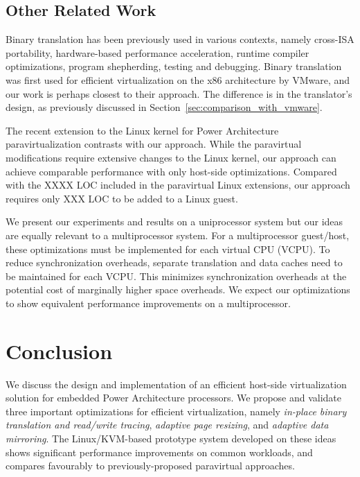 \documentclass[10pt,twocolumn]{article}
\begin{document}
\subsection{Other Related Work}
Binary translation has been previously used in various contexts, namely
cross-ISA portability\cite{bansal:osdi08, qemu:software}, hardware-based
performance acceleration\cite{transmeta_crusoe:chip}, runtime compiler
optimizations\cite{bala00dynamo}, program shepherding\cite{bruening04thesis},
testing and debugging\cite{valgrind}. Binary translation was
first used for efficient virtualization on the x86 architecture by
VMware\cite{agesen:comparison}, and our work
is perhaps closest to their approach. The difference is in the translator's design,
as previously discussed in Section~\ref{sec:comparison_with_vmware}.

The recent extension to the Linux kernel for Power Architecture paravirtualization
contrasts with our approach. While the paravirtual modifications require extensive
changes to the Linux kernel, our approach can achieve comparable performance
with only host-side optimizations. Compared with the XXXX LOC included in the
paravirtual Linux extensions, our approach requires only XXX LOC to be added to
a Linux guest.

We present our experiments and results on a uniprocessor system but our
ideas are equally relevant to a multiprocessor system. For a multiprocessor
guest/host, these optimizations must be implemented for each virtual CPU (VCPU).
To reduce synchronization
overheads, separate translation and data caches need to be maintained for each VCPU.
This minimizes synchronization overheads at the potential cost of marginally higher
space overheads. We expect
our optimizations to show equivalent performance improvements on a multiprocessor.
\section{Conclusion}
We discuss the design and implementation of an efficient host-side virtualization
solution
for embedded Power Architecture processors. We propose and validate three important
optimizations
for efficient virtualization, namely {\em in-place binary translation and read/write
tracing}, {\em adaptive page resizing}, and {\em adaptive data mirroring}. 
The Linux/KVM-based prototype system developed on these ideas shows significant
performance improvements on common workloads, and compares favourably to
previously-proposed paravirtual approaches.


\end{document}
